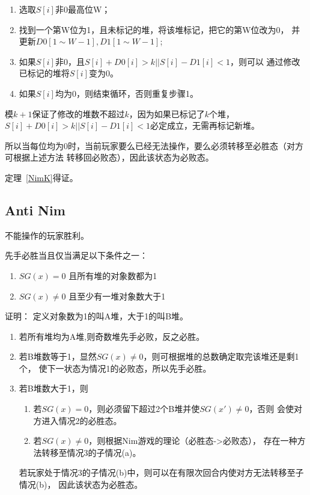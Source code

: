 \begin{enumerate}
	\item 选取$S[i]$非0最高位W；
	\item 找到一个第W位为1，且未标记的堆，将该堆标记，把它的第W位改为0，
	      并更新$D0[1\sim W-1],D1[1\sim W-1]$;
	\item 如果$S[i]$非0，且$S[i]+D0[i]>k || S[i]-D1[i]<1$，则可以
	      通过修改已标记的堆将$S[i]$变为0。
	\item 如果$S[i]$均为0，则结束循环，否则重复步骤1。
\end{enumerate}

模$k+1$保证了修改的堆数不超过$k$，因为如果已标记了$k$个堆，$S[i]+D0[i]>k ||
	S[i]-D1[i]<1$必定成立，无需再标记新堆。

所以当每位均为0时，当前玩家要么已经无法操作，要么必须转移至必胜态（对方可根据上述方法
转移回必败态），因此该状态为必败态。

定理~\ref{NimK}得证。

\subsection{Anti Nim}


不能操作的玩家胜利。

\begin{theorem}\label{AntiNim}
	先手必胜当且仅当满足以下条件之一：
	\begin{enumerate}
		\item $SG(x)=0$ 且所有堆的对象数都为1
		\item $SG(x)\not=0$ 且至少有一堆对象数大于1
	\end{enumerate}

\end{theorem}

证明：
定义对象数为1的叫A堆，大于1的叫B堆。

\begin{enumerate}
	\item 若所有堆均为A堆,则奇数堆先手必败，反之必胜。
	\item 若B堆数等于1，显然$SG(x)\not=0$，则可根据堆的总数确定取完该堆还是剩1个，
	      使下一状态为情况1的必败态，所以先手必胜。
	\item 若B堆数大于1，则
	      \begin{enumerate}
		      \item 若$SG(x)=0$，则必须留下超过2个B堆并使$SG(x')\not=0$，否则
		            会使对方进入情况2的必胜态。
		      \item 若$SG(x)\not=0$，则根据Nim游戏的理论（必胜态->必败态），
		            存在一种方法转移至情况3的子情况(a)。
	      \end{enumerate}
	      若玩家处于情况3的子情况(b)中，则可以在有限次回合内使对方无法转移至子情况(b)，
	      因此该状态为必胜态。
\end{enumerate}


